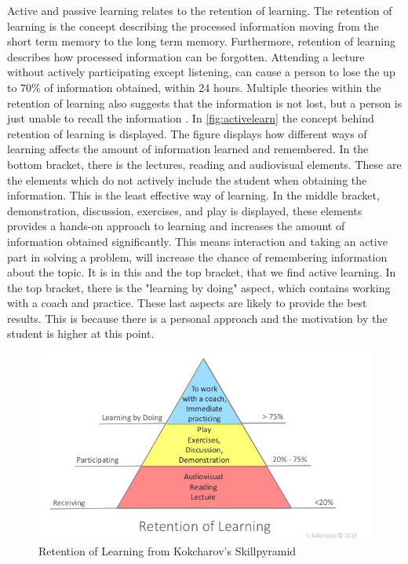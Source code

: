 Active and passive learning relates to the retention of learning.
The retention of learning is the concept describing the processed information moving from the short term memory to the long term memory\cite{retention}. Furthermore, retention of learning describes how processed information can be forgotten. Attending a lecture without actively participating except listening, can cause a person to lose the up to 70\% of information obtained, within 24 hours\cite{retention}. Multiple theories within the retention of learning also suggests that the information is not lost, but a person is just unable to recall the information \cite{retention}.
In \autoref{fig:activelearn} the concept behind retention of learning is displayed. The figure displays how different ways of learning affects the amount of information learned and remembered. In the bottom bracket, there is the lectures, reading and audiovisual elements. These are the elements which do not actively include the student when obtaining the information. This is the least effective way of learning\cite{activelearning}. In the middle bracket, demonstration, discussion, exercises, and play is displayed, these elements provides a hands-on approach to learning and increases the amount of information obtained significantly\cite{activelearning}. This means interaction and taking an active part in solving a problem, will increase the chance of remembering information about the topic. It is in this and the top bracket, that we find active learning. In the top bracket, there is the "learning by doing" aspect, which contains working with a coach and practice. These last aspects are likely to provide the best results\cite{activelearning}. This is because there is a personal approach and the motivation by the student is higher at this point\cite{retention}. 

\begin{figure}[H]
	\centering
	\includegraphics[width=0.9\linewidth]{figure/Analysis/skillslearn}
	\caption{Retention of Learning from Kokcharov's Skillpyramid\cite{skillPyramid}}
	\label{fig:activelearn}
\end{figure}

